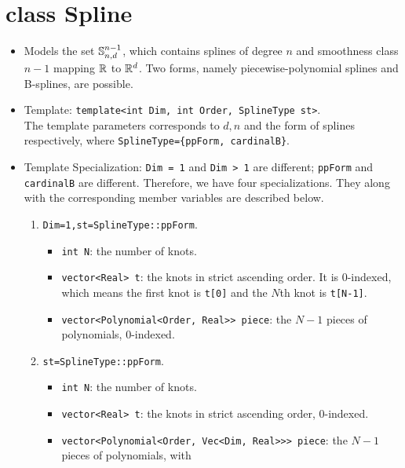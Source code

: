 \documentclass[12pt]{article}
\begin{document}
\section{class Spline}

    \begin{itemize}
        \item Models the set \(\S_{n,d}^{n-1}\), which contains splines of degree \(n\) and 
              smoothness class \(n-1\) mapping \(\R\) to \(\R^d\). 
              Two forms, namely piecewise-polynomial splines and B-splines, are possible.
        \item Template: \texttt{template<int Dim, int Order, SplineType st>}. \\
              The template parameters corresponds to \(d,n\) and the form of splines respectively, where
              \texttt{SplineType=\{ppForm, cardinalB\}}.
        \item Template Specialization: \texttt{Dim = 1} and \texttt{Dim > 1} are different; \texttt{ppForm} and 
              \texttt{cardinalB} are different. Therefore, we have four specializations. They along with the corresponding
              member variables are described below.
              \begin{enumerate}
                  \item \texttt{Dim=1,st=SplineType::ppForm}.
                        \begin{itemize}
                            \item \texttt{int N}: the number of knots.
                            \item \texttt{vector<Real> t}: the knots in strict ascending order. It is 0-indexed, which means the first
                                  knot is \texttt{t[0]} and the \(N\)th knot is \texttt{t[N-1]}.
                            \item \texttt{vector<Polynomial<Order, Real>> piece}: the \(N-1\) pieces of polynomials, 0-indexed.
                        \end{itemize}
                  \item \texttt{st=SplineType::ppForm}.
                        \begin{itemize}
                            \item \texttt{int N}: the number of knots.
                            \item \texttt{vector<Real> t}: the knots in strict ascending order, 0-indexed.
                            \item \texttt{vector<Polynomial<Order, Vec<Dim, Real>>> piece}: the \(N-1\) pieces of polynomials, with 

\end{itemize}
\end{enumerate}
\end{itemize}
\end{document}
